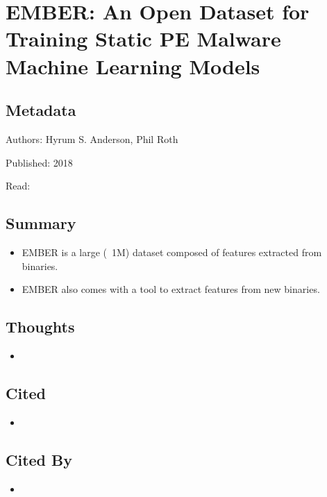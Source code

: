 \documentclass{article}
\begin{document}
\pagebreak


\section*{EMBER: An Open Dataset for Training Static PE Malware Machine Learning Models}

\subsection*{Metadata}

\noindent Authors: Hyrum S. Anderson, Phil Roth

\noindent Published: 2018

\noindent Read:

\subsection*{Summary}
\begin{itemize}
\item EMBER is a large (~1M) dataset composed of features extracted from binaries.
\item EMBER also comes with a tool to extract features from new binaries.
\end{itemize}

\subsection*{Thoughts}
\begin{itemize}
\item
\end{itemize}

\subsection*{Cited}
\begin{itemize}
\item
\end{itemize}

\subsection*{Cited By}
\begin{itemize}
\item
\end{itemize}
\end{document}
